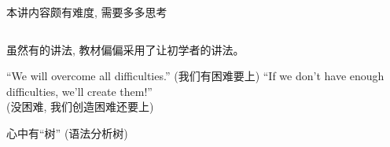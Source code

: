 
\begin{frame}{}
\end{frame}

\begin{frame}{}
\end{frame}

\begin{frame}{}
  \begin{center}
    \begin{center}
      本讲内容颇有难度, 需要多多思考
    \end{center}
  \end{center}
\end{frame}

\begin{frame}{}
  \begin{columns}
  \end{columns}
  \begin{center}
    虽然有的讲法, 教材偏偏采用了让初学者的讲法。
  \end{center}
\end{frame}

\begin{frame}{}
  \begin{center}
    ``We will overcome all difficulties.'' (我们有困难要上)
    ``If we don't have enough difficulties, we'll create them!'' \\
    (没困难, 我们创造困难还要上)
  \end{center}
\end{frame}

\begin{frame}{}
  \begin{center}

    \pause
    \vspace{1.00cm}

    \pause
    \vspace{1.00cm}
  \end{center}
\end{frame}

\begin{frame}
  \begin{center}
    心中有``树'' (语法分析树)
  \end{center}
\end{frame}
